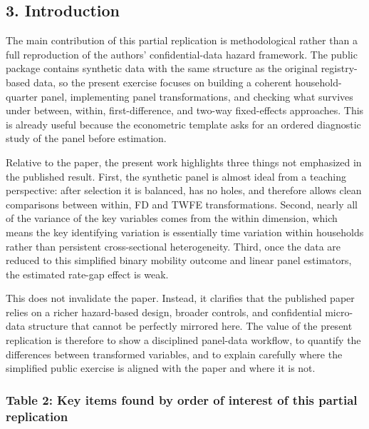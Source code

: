 \documentclass[a4paper,11pt]{article}
\renewcommand{\_}{\textunderscore\allowbreak}
\begin{document}
\hypertarget{introduction}{%
\subsection{3. Introduction}\label{introduction}}

The main contribution of this partial replication is methodological
rather than a full reproduction of the authors' confidential-data hazard
framework. The public package contains synthetic data with the same
structure as the original registry-based data, so the present exercise
focuses on building a coherent household-quarter panel, implementing
panel transformations, and checking what survives under between, within,
first-difference, and two-way fixed-effects approaches. This is already
useful because the econometric template asks for an ordered diagnostic
study of the panel before estimation.

Relative to the paper, the present work highlights three things not
emphasized in the published result. First, the synthetic panel is almost
ideal from a teaching perspective: after selection it is balanced, has
no holes, and therefore allows clean comparisons between within, FD and
TWFE transformations. Second, nearly all of the variance of the key
variables comes from the within dimension, which means the key
identifying variation is essentially time variation within households
rather than persistent cross-sectional heterogeneity. Third, once the
data are reduced to this simplified binary mobility outcome and linear
panel estimators, the estimated rate-gap effect is weak.

This does not invalidate the paper. Instead, it clarifies that the
published paper relies on a richer hazard-based design, broader
controls, and confidential micro-data structure that cannot be perfectly
mirrored here. The value of the present replication is therefore to show
a disciplined panel-data workflow, to quantify the differences between
transformed variables, and to explain carefully where the simplified
public exercise is aligned with the paper and where it is not.

\hypertarget{table-2-key-items-found-by-order-of-interest-of-this-partial-replication}{%
\subsubsection{Table 2: Key items found by order of interest of this
partial
replication}\label{table-2-key-items-found-by-order-of-interest-of-this-partial-replication}}
\end{document}
